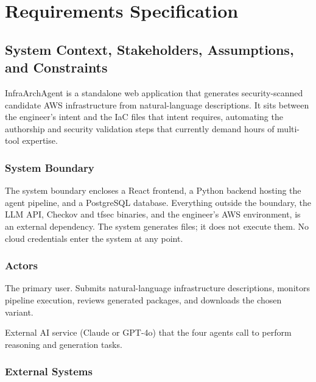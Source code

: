 \chapter{Requirements Specification}
\label{ch:requirements}

\section{System Context, Stakeholders, Assumptions, and Constraints}
\label{sec:context}

InfraArchAgent is a standalone web application that generates security-scanned
candidate AWS infrastructure from natural-language descriptions. It sits between
the engineer's intent and the IaC files that intent requires, automating the
authorship and security validation steps that currently demand hours of
multi-tool expertise.

\subsection*{System Boundary}

The system boundary encloses a React frontend, a Python backend hosting the
agent pipeline, and a PostgreSQL database. Everything outside the boundary,
the LLM API, Checkov and tfsec binaries, and the engineer's AWS environment,
is an external dependency. The system generates files; it does not execute
them. No cloud credentials enter the system at any point.

\subsection*{Actors}

\begin{description}[leftmargin=3cm, style=nextline]
  \item[DevOps Engineer] The primary user. Submits natural-language
    infrastructure descriptions, monitors pipeline execution, reviews
    generated packages, and downloads the chosen variant.
  \item[LLM API] External AI service (Claude or GPT-4o) that the four
    agents call to perform reasoning and generation tasks.
\end{description}

\subsection*{External Systems}

